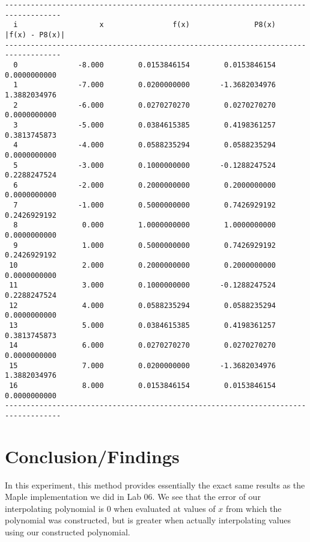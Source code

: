 \documentclass[letterpaper,10pt,titlepage]{report}
\begin{document}
\begin{verbatim}
-----------------------------------------------------------------------------------
  i                   x                f(x)               P8(x)      |f(x) - P8(x)|
-----------------------------------------------------------------------------------
  0              -8.000        0.0153846154        0.0153846154        0.0000000000
  1              -7.000        0.0200000000       -1.3682034976        1.3882034976
  2              -6.000        0.0270270270        0.0270270270        0.0000000000
  3              -5.000        0.0384615385        0.4198361257        0.3813745873
  4              -4.000        0.0588235294        0.0588235294        0.0000000000
  5              -3.000        0.1000000000       -0.1288247524        0.2288247524
  6              -2.000        0.2000000000        0.2000000000        0.0000000000
  7              -1.000        0.5000000000        0.7426929192        0.2426929192
  8               0.000        1.0000000000        1.0000000000        0.0000000000
  9               1.000        0.5000000000        0.7426929192        0.2426929192
 10               2.000        0.2000000000        0.2000000000        0.0000000000
 11               3.000        0.1000000000       -0.1288247524        0.2288247524
 12               4.000        0.0588235294        0.0588235294        0.0000000000
 13               5.000        0.0384615385        0.4198361257        0.3813745873
 14               6.000        0.0270270270        0.0270270270        0.0000000000
 15               7.000        0.0200000000       -1.3682034976        1.3882034976
 16               8.000        0.0153846154        0.0153846154        0.0000000000
-----------------------------------------------------------------------------------
\end{verbatim}

\section{Conclusion/Findings}
In this experiment, this method provides essentially the exact same results as
the Maple implementation we did in Lab 06. We see that the error of our
interpolating polynomial is 0 when evaluated at values of $x$ from which the
polynomial was constructed, but is greater when actually interpolating values
using our constructed polynomial.
\end{document}
